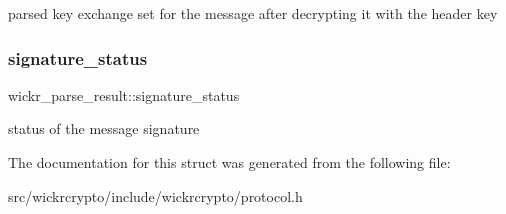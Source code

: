 parsed key exchange set for the message after decrypting it with the header key \mbox{\label{structwickr__parse__result_a989166b5471898853f03b9e9c58f69c0}} 
\subsubsection{\texorpdfstring{signature\_status}{signature\_status}}
{\footnotesize\ttfamily wickr\+\_\+parse\+\_\+result\+::signature\+\_\+status}

status of the message signature 

The documentation for this struct was generated from the following file\+:\begin{DoxyCompactItemize}
\item 
src/wickrcrypto/include/wickrcrypto/protocol.\+h\end{DoxyCompactItemize}
